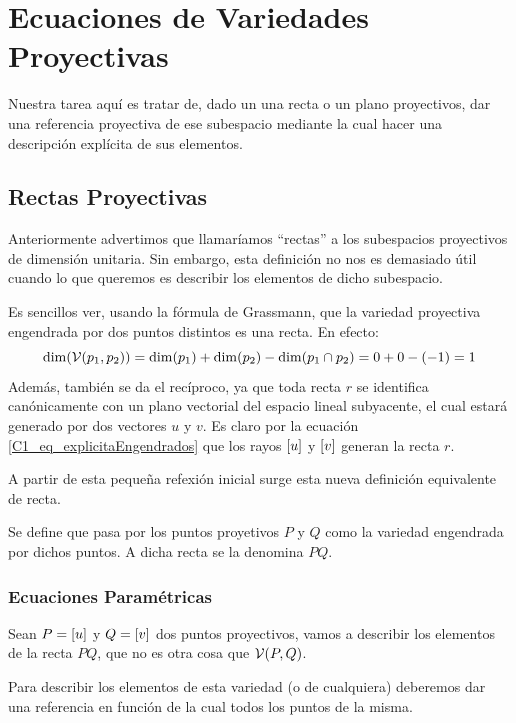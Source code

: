 \chapter{Ecuaciones de Variedades Proyectivas}
\label{C3}

Nuestra tarea aquí es tratar de, dado un una recta o un plano proyectivos, dar una referencia proyectiva de ese subespacio mediante la cual hacer una descripción explícita de sus elementos.

\section{Rectas Proyectivas}\label{C3_sec_rectas}
Anteriormente advertimos que llamaríamos ``rectas'' a los subespacios proyectivos de dimensión unitaria. Sin embargo, esta definición no nos es demasiado útil cuando lo que queremos es describir los elementos de dicho subespacio.

Es sencillos ver, usando la fórmula de Grassmann, que la variedad proyectiva engendrada por dos puntos distintos es una recta. En efecto:
\[\dim(\mathcal{V}(p_1,p_2))=\dim(p_1)+\dim(p_2)-\dim(p_1\cap p_2)=0+0-(-1)=1\]
Además, también se da el recíproco, ya que toda recta $r$ se identifica canónicamente con un plano vectorial del espacio lineal subyacente, el cual estará generado por dos vectores $u$ y $v$. Es claro por la ecuación \eqref{C1_eq_explicitaEngendrados} que los rayos $\left [ u \right ]$ y $\left [ v \right ]$ generan la recta $r$.

A partir de esta pequeña refexión inicial surge esta nueva definición equivalente de recta.
\begin{defi}
	\label{C1_def_rectaProyectiva}
	Se define  que pasa por los puntos proyetivos $P$ y $Q$ como la variedad engendrada por dichos puntos. A dicha recta se la denomina  $PQ$.
\end{defi}
\subsection{Ecuaciones Paramétricas}\label{C3_subsec_ec_parametricas_recta}

Sean $P=\left [ u \right ]$ y $Q=\left [ v \right ]$ dos puntos proyectivos, vamos a describir los elementos de la recta $PQ$, que no es otra cosa que $\mathcal{V}(P,Q)$.
	
Para describir los elementos de esta variedad (o de cualquiera) deberemos dar una referencia en función de la cual  todos los puntos de la misma.
	

